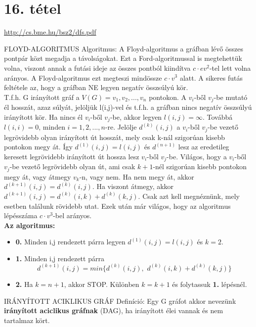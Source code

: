 \section{16. tétel}

\url{http://cs.bme.hu/bsz2/dfs.pdf}
\begin{framed}
FLOYD-ALGORITMUS Algoritmus: A Floyd-algoritmus a gráfban lévő összes pontpár közt megadja a távolságokat. Ezt a Ford-algoritmussal is megtehettük volna, viszont annak a futási ideje az összes pontból kiindítva $c\cdot ev^2$-tel lett volna arányos. A Floyd-algoritmus ezt megteszi mindössze $c\cdot v^3$ alatt. A sikeres futás feltétele az, hogy a gráfban NE legyen negatív összsúlyú kör.\\
T.f.h. G irányított gráf a $V(G) = {v_1, v_2,..., v_n}$ pontokon. A $v_i$-ből $v_j$-be mutató él hosszát, azaz súlyát, jelöljük l(i,j)-vel és t.f.h. a gráfban nincs negatív összsúlyú irányított kör. Ha nincs él $v_i$-ből $v_j$-be, akkor legyen $l(i,j) = \infty$. Továbbá $l(i,i) = 0$, minden $i = 1, 2,..., n$-re. Jelölje $d^{(k)}(i,j)$ a $v_i$-ből $v_j$-be vezető legrövidebb olyan irányított út hosszát, mely csak k-nál szigorúan kisebb pontokon megy át. Így $d^{(1)}(i,j) = l(i,j)$ és $d^{(n+1)}$ lesz az eredetileg keresett legrövidebb irányított út hossza lesz $v_i$-ből $v_j$-be. Világos, hogy a $v_i$-ből $v_j$-be vezető legrövidebb olyan út, ami csak $k + 1$-nél szigorúan kisebb pontokon megy át, vagy átmegy $v_k$-n, vagy nem. Ha nem megy át, akkor $d^{(k+1)}(i,j) = d^{(k)}(i,j)$. Ha viszont átmegy, akkor $d^{(k+1)}(i,j) = d^{(k)}(i,k) + d^{(k)}(k,j)$. Csak azt kell megnéznünk, mely esetben találunk rövidebb utat. Ezek után már világos, hogy az algoritmus lépésszáma $c\cdot v^3$-bel arányos.
\\
\textbf{Az algoritmus:}
\begin{itemize}
\item{\textbf{0.}} Minden i,j rendezett párra legyen $d^{(1)}(i,j) = l(i,j)$ és $k=2$.
\item{\textbf{1.}} Minden i,j rendezett párra
$$d^{(k+1)}(i,j) = min\{d^{(k)}(i,j),\,\, d^{(k)}(i,k) + d^{(k)}(k,j)\}$$
\item{\textbf{2.}} Ha $k = n + 1$, akkor STOP. Különben $k = k + 1$ és folytassuk \textbf{1.} lépésnél.
\end{itemize}
\end{framed}
\begin{shaded}
IRÁNYÍTOTT ACIKLIKUS GRÁF Definíció: Egy G gráfot akkor nevezünk \textbf{irányított aciclikus gráfnak} (DAG), ha irányított élei vannak és nem tartalmaz kört.
\end{shaded}
